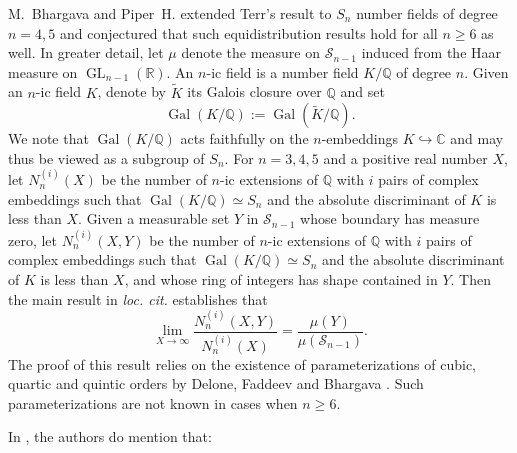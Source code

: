 \documentclass[table]{amsart}
\newcommand{\Q}{\mathbb{Q}}
\newcommand{\op}[1]{\operatorname{#1}}
\numberwithin{equation}{section}
\begin{document}
\par M.~Bhargava and Piper~H. extended Terr's result to $S_n$ number fields of degree $n=4,5$ and conjectured that such equidistribution results hold for all $n\geq 6$ as well. In greater detail, let $\mu$ denote the measure on $\mathcal{S}_{n-1}$ induced from the Haar measure on $\op{GL}_{n-1}(\mathbb{R})$. An $n$-ic field is a number field $K/\Q$ of degree $n$. Given an $n$-ic field $K$,  denote by $\widetilde{K}$ its Galois closure over $\Q$ and set 
\[\op{Gal}(K/\Q):=\op{Gal}(\widetilde{K}/\Q).\] We note that $\op{Gal}(K/\Q)$ acts faithfully on the $n$-embeddings $K\hookrightarrow \mathbb{C}$ and may thus be viewed as a subgroup of $S_n$. For $n=3,4,5$ and a positive real number $X$, let $N_n^{(i)}(X)$ be the number of $n$-ic extensions of $\Q$ with $i$ pairs of complex embeddings such that $\op{Gal}(K/\Q)\simeq S_n$ and the absolute discriminant of $K$ is less than $X$. Given a measurable set $Y$ in $\mathcal{S}_{n-1}$ whose boundary has measure zero, let $N_n^{(i)}(X, Y)$ be the number of $n$-ic extensions of $\Q$ with $i$ pairs of complex embeddings such that $\op{Gal}(K/\Q)\simeq S_n$ and the absolute discriminant of $K$ is less than $X$, and whose ring of integers has shape contained in $Y$. Then the main result in \emph{loc. cit.} establishes that 
\[\lim_{X\rightarrow \infty} \frac{N_n^{(i)}(X, Y)}{N_n^{(i)}(X)}=\frac{\mu(Y)}{\mu(\mathcal{S}_{n-1})}. \] The proof of this result relies on the existence of parameterizations of cubic, quartic and quintic orders by Delone, Faddeev \cite{DeloneFaddeev} and Bhargava \cite{HighercompositionIII, HighercompositionIV}. Such parameterizations are not known in cases when $n\geq 6$.
\par In \cite{BH16}, the authors do mention that: 
\end{document}
